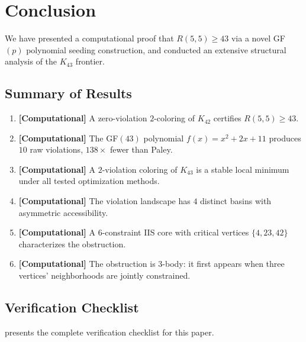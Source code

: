 \documentclass[12pt,a4paper]{article}
\newcommand{\computational}[1]{\textcolor{computational}{\textbf{[Computational]}} #1}
\theoremstyle{definition}
\theoremstyle{remark}
\newcommand{\Kn}[1]{K_{#1}}
\newcommand{\Rnum}[2]{R(#1,#2)}
\begin{document}

\section{Conclusion}\label{sec:conclusion}

We have presented a computational proof that $\Rnum{5}{5} \ge 43$ via a novel GF$(p)$ polynomial seeding construction, and conducted an extensive structural analysis of the $\Kn{43}$ frontier.

\subsection{Summary of Results}

\begin{enumerate}[nosep]
    \item \computational{A zero-violation $2$-coloring of $\Kn{42}$ certifies $\Rnum{5}{5} \ge 43$.}
    \item \computational{The GF$(43)$ polynomial $f(x) = x^2 + 2x + 11$ produces $10$ raw violations, $138\times$ fewer than Paley.}
    \item \computational{A $2$-violation coloring of $\Kn{43}$ is a stable local minimum under all tested optimization methods.}
    \item \computational{The violation landscape has $4$ distinct basins with asymmetric accessibility.}
    \item \computational{A $6$-constraint IIS core with critical vertices $\{4, 23, 42\}$ characterizes the obstruction.}
    \item \computational{The obstruction is $3$-body: it first appears when three vertices' neighborhoods are jointly constrained.}
\end{enumerate}

\subsection{Verification Checklist}

 presents the complete verification checklist for this paper.
\end{document}
